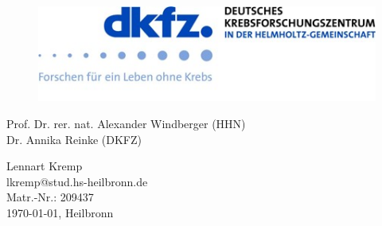\documentclass[11pt, a4paper,onecolumn ,titlepage]{article}
\begin{document}
\begin{titlepage}
\begin{center}
\begin{figure}[H]
            \end{figure}

            \begin{figure}[H]
            \centering
                \begin{minipage}[b]{0.8\linewidth} %
                    \includegraphics[width=\linewidth]{Title/dkfz}
                \end{minipage}\label{fig:dkfz}
            \end{figure}



            \vfill

            {\centering
            Prof. Dr. rer. nat. Alexander Windberger (HHN) \\
            Dr. Annika Reinke (DKFZ)
            }

            \vspace{1.0cm}


            \vspace{0.8cm}

            {\centering
            Lennart Kremp \\
            lkremp@stud.hs-heilbronn.de \\
            Matr.-Nr.: 209437 \\

            \today{}, Heilbronn}


        \end{center}

    \end{titlepage}

\end{document}
